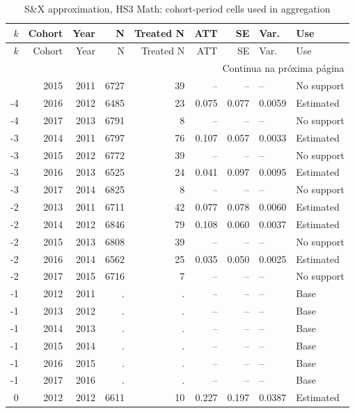 ﻿\begingroup
\tiny
\setlength{\tabcolsep}{2.2pt}
\renewcommand{\arraystretch}{0.82}
\begin{longtable}{rrrrrrrll}
\caption{S\&X approximation, HS3 Math: cohort-period cells used in aggregation}
\label{tab:ap_sx_celulas_HS3_mat}\\
\toprule
\(k\) & Cohort & Year & N & Treated N & ATT & SE & Var. & Use \\
\midrule
\endfirsthead
\toprule
\(k\) & Cohort & Year & N & Treated N & ATT & SE & Var. & Use \\
\midrule
\endhead
\midrule
\multicolumn{9}{r}{Continua na próxima página} \\
\endfoot
\bottomrule
\endlastfoot
-4 & 2015 & 2011 & 6727 & 39 & -- & -- & -- & No support \\
-4 & 2016 & 2012 & 6485 & 23 & 0.075 & 0.077 & 0.0059 & Estimated \\
-4 & 2017 & 2013 & 6791 & 8 & -- & -- & -- & No support \\
-3 & 2014 & 2011 & 6797 & 76 & 0.107 & 0.057 & 0.0033 & Estimated \\
-3 & 2015 & 2012 & 6772 & 39 & -- & -- & -- & No support \\
-3 & 2016 & 2013 & 6525 & 24 & 0.041 & 0.097 & 0.0095 & Estimated \\
-3 & 2017 & 2014 & 6825 & 8 & -- & -- & -- & No support \\
-2 & 2013 & 2011 & 6711 & 42 & 0.077 & 0.078 & 0.0060 & Estimated \\
-2 & 2014 & 2012 & 6846 & 79 & 0.108 & 0.060 & 0.0037 & Estimated \\
-2 & 2015 & 2013 & 6808 & 39 & -- & -- & -- & No support \\
-2 & 2016 & 2014 & 6562 & 25 & 0.035 & 0.050 & 0.0025 & Estimated \\
-2 & 2017 & 2015 & 6716 & 7 & -- & -- & -- & No support \\
-1 & 2012 & 2011 & . & . & -- & -- & -- & Base \\
-1 & 2013 & 2012 & . & . & -- & -- & -- & Base \\
-1 & 2014 & 2013 & . & . & -- & -- & -- & Base \\
-1 & 2015 & 2014 & . & . & -- & -- & -- & Base \\
-1 & 2016 & 2015 & . & . & -- & -- & -- & Base \\
-1 & 2017 & 2016 & . & . & -- & -- & -- & Base \\
0 & 2012 & 2012 & 6611 & 10 & 0.227 & 0.197 & 0.0387 & Estimated \\

\end{longtable}
